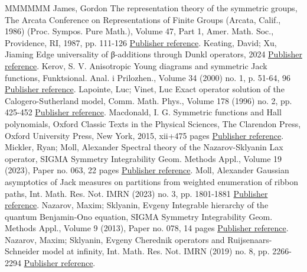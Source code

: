 \documentclass[11pt]{article}
\theoremstyle{definition}
\numberwithin{equation}{section}
\begin{document}
\begin{thebibliography}{MMMMMM}
 James, Gordon The representation theory of the symmetric groups, The Arcata Conference on Representations of Finite Groups (Arcata, Calif., 1986) (Proc. Sympos. Pure Math.), Volume 47, Part 1, Amer. Math. Soc., Providence, RI, 1987, pp. 111-126 \href{https://alco.centre-mersenne.org/articles/10.5802/alco.451/#james2006representation}{Publisher reference}.
 Keating, David; Xu, Jiaming Edge universality of β-additions through Dunkl operators, 2024 \href{https://alco.centre-mersenne.org/articles/10.5802/alco.451/#KX2024}{Publisher reference}.
 Kerov, S. V. Anisotropic Young diagrams and symmetric Jack functions, Funktsional. Anal. i Prilozhen., Volume 34 (2000) no. 1, p. 51-64, 96 \href{https://alco.centre-mersenne.org/articles/10.5802/alco.451/#kerov2000anisotropic}{Publisher reference}.
 Lapointe, Luc; Vinet, Luc Exact operator solution of the Calogero-Sutherland model, Comm. Math. Phys., Volume 178 (1996) no. 2, pp. 425-452 \href{https://alco.centre-mersenne.org/articles/10.5802/alco.451/#lapointe1996exact}{Publisher reference}.
 Macdonald, I. G. Symmetric functions and Hall polynomials, Oxford Classic Texts in the Physical Sciences, The Clarendon Press, Oxford University Press, New York, 2015, xii+475 pages \href{https://alco.centre-mersenne.org/articles/10.5802/alco.451/#macdonald1998symmetric}{Publisher reference}.
 Mickler, Ryan; Moll, Alexander Spectral theory of the Nazarov-Sklyanin Lax operator, SIGMA Symmetry Integrability Geom. Methods Appl., Volume 19 (2023), Paper no. 063, 22 pages \href{https://alco.centre-mersenne.org/articles/10.5802/alco.451/#mickler2023spectral}{Publisher reference}.
 Moll, Alexander Gaussian asymptotics of Jack measures on partitions from weighted enumeration of ribbon paths, Int. Math. Res. Not. IMRN (2023) no. 3, pp. 1801-1881 \href{https://alco.centre-mersenne.org/articles/10.5802/alco.451/#moll2023gaussian}{Publisher reference}.
 Nazarov, Maxim; Sklyanin, Evgeny Integrable hierarchy of the quantum Benjamin-Ono equation, SIGMA Symmetry Integrability Geom. Methods Appl., Volume 9 (2013), Paper no. 078, 14 pages \href{https://alco.centre-mersenne.org/articles/10.5802/alco.451/#nazarov2013integrable}{Publisher reference}.
 Nazarov, Maxim; Sklyanin, Evgeny Cherednik operators and Ruijsenaars-Schneider model at infinity, Int. Math. Res. Not. IMRN (2019) no. 8, pp. 2266-2294 \href{https://alco.centre-mersenne.org/articles/10.5802/alco.451/#nazarov2019cherednik}{Publisher reference}.

\end{thebibliography}
\end{document}
